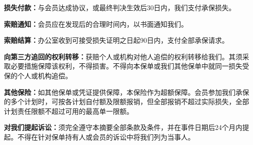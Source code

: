 \documentclass[UTF8,fontset=none,11pt,a4paper]{ctexart}
\begin{document}
\textbf{损失付款：}与会员达成协议，或最终判决生效后30日内，我们支付\allowbreak\mbox{承保损失。}


\textbf{索赔通知：}会员应在发现后的合理时间内，以书面\allowbreak\mbox{通知我们。}


\textbf{索赔结算：}办公室收到可接受损失证明之日起90日内，支付全部\allowbreak\mbox{承保请求。}


\textbf{向第三方追回的权利转移：}获赔个人或机构对他人追偿的权利转移给我们。其须采取必要措施保障该权利，不得损害。不得向本保单或我们其他保单中就同一损失受保的个人或\allowbreak\mbox{机构追偿。}


\textbf{其他保险：}如其他保单或凭证提供保障，本保险作为超额保障。会员参加我们承保的多个计划时，可按各计划自付额及限额报销，但全部报销不超过实际损失，全部计划责任限额不超过可用的最高\allowbreak\mbox{单一限额。}


\textbf{对我们提起诉讼：}须完全遵守本摘要全部条款及条件，并在事件日期后24个月内提起。不得在针对保单持有人或会员的诉讼中将我们列\allowbreak\mbox{为当事人。}
\end{document}
